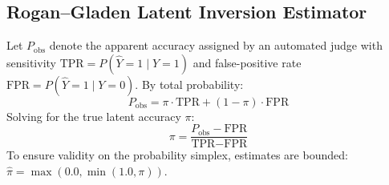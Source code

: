 \subsection{Rogan--Gladen Latent Inversion Estimator}
Let $P_{\text{obs}}$ denote the apparent accuracy assigned by an automated judge with sensitivity $\text{TPR} = P(\hat{Y}=1 \mid Y=1)$ and false-positive rate $\text{FPR} = P(\hat{Y}=1 \mid Y=0)$. By total probability:
\begin{equation}
P_{\text{obs}} = \pi \cdot \text{TPR} + (1 - \pi) \cdot \text{FPR}
\end{equation}
Solving for the true latent accuracy $\pi$:
\begin{equation}
\pi = \frac{P_{\text{obs}} - \text{FPR}}{\text{TPR} - \text{FPR}}
\end{equation}
To ensure validity on the probability simplex, estimates are bounded: $\hat{\pi} = \max(0.0, \min(1.0, \pi))$.
